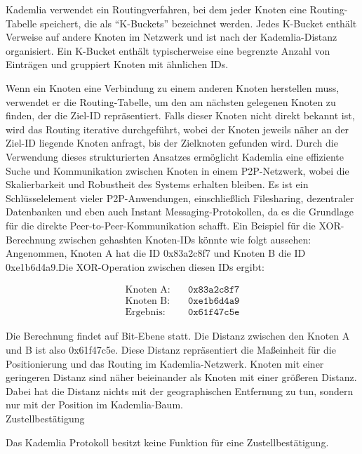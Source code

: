 Kademlia verwendet ein Routingverfahren, bei dem jeder Knoten eine Routing-\\
Tabelle 
speichert, die als \enquote{K-Buckets} bezeichnet werden. Jedes K-Bucket enthält Verweise 
auf andere Knoten im Netzwerk und ist nach der Kademlia-Distanz organisiert. Ein 
K-Bucket enthält typischerweise eine begrenzte Anzahl von Einträgen und gruppiert 
Knoten mit ähnlichen IDs.

Wenn ein Knoten eine Verbindung zu einem anderen Knoten herstellen muss, verwendet 
er die Routing-Tabelle, um den am nächsten gelegenen Knoten zu finden, der die 
Ziel-ID repräsentiert. Falls dieser Knoten nicht direkt bekannt ist, wird das 
Routing iterative durchgeführt, wobei der Knoten jeweils näher an der Ziel-ID 
liegende Knoten anfragt, bis der Zielknoten gefunden wird. Durch die Verwendung 
dieses strukturierten Ansatzes ermöglicht Kademlia eine effiziente Suche und 
Kommunikation zwischen Knoten in einem P2P-Netzwerk, wobei die Skalierbarkeit 
und Robustheit des Systems erhalten bleiben. Es ist ein Schlüsselelement vieler 
P2P-Anwendungen, einschließlich Filesharing, dezentraler Datenbanken und eben auch 
Instant Messaging-Protokollen, da es die Grundlage für die direkte 
Peer-to-Peer-Kommunikation schafft.
Ein Beispiel für die XOR-Berechnung zwischen gehashten Knoten-IDs könnte 
wie folgt aussehen:
Angenommen, Knoten A hat die ID 0x83a2c8f7 und Knoten B die ID 0xe1b6d4a9.Die XOR-Operation 
zwischen diesen IDs ergibt:

\begin{equation}
    \begin{aligned}
        \text{Knoten A:} & \quad \texttt{0x83a2c8f7} \\
        \text{Knoten B:} & \quad \texttt{0xe1b6d4a9} \\
        \text{Ergebnis:} & \quad \texttt{0x61f47c5e}
    \end{aligned}
\end{equation}

\noindent Die Berechnung findet auf Bit-Ebene statt. Die Distanz zwischen den Knoten A und B
ist also 0x61f47c5e.
Diese Distanz repräsentiert die Maßeinheit für die Positionierung und das Routing 
im Kademlia-Netzwerk. Knoten mit einer geringeren Distanz sind näher beieinander
als Knoten mit einer größeren Distanz. Dabei hat die Distanz nichts mit der
geographischen Entfernung zu tun, sondern nur mit der Position im Kademlia-Baum.
\\

\noindent Zustellbestätigung

\noindent Das Kademlia Protokoll besitzt keine Funktion für eine Zustellbestätigung.